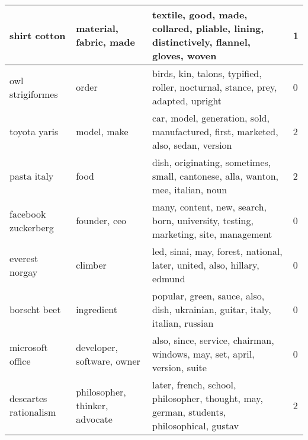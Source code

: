 \documentclass[11pt,a4paper]{article}
\begin{document}
\begin{longtable}[c]{|l|l|p{5cm}|l|}
shirt cotton  & material, fabric, made & textile, good, made, collared, pliable, lining, distinctively, flannel, gloves, woven & 1 \\ \hline 
owl strigiformes  & order & birds, kin, talons, typified, roller, nocturnal, stance, prey, adapted, upright & 0 \\ \hline 
toyota yaris  & model, make & car, model, generation, sold, manufactured, first, marketed, also, sedan, version & 2 \\ \hline
pasta italy  & food & dish, originating, sometimes, small, cantonese, alla, wanton, mee, italian, noun & 2 \\ \hline 
facebook zuckerberg  & founder, ceo & many, content, new, search, born, university, testing, marketing, site, management & 0 \\ \hline 
everest norgay  & climber & led, sinai, may, forest, national, later, united, also, hillary, edmund & 0 \\ \hline 
borscht beet  & ingredient & popular, green, sauce, also, dish, ukrainian, guitar, italy, italian, russian & 0 \\ \hline 
microsoft office  & developer, software, owner & also, since, service, chairman, windows, may, set, april, version, suite & 0 \\ \hline  
descartes rationalism  & philosopher, thinker, advocate & later, french, school, philosopher, thought, may, german, students, philosophical, gustav & 2 \\ \hline 
\end{longtable}
\end{document}

